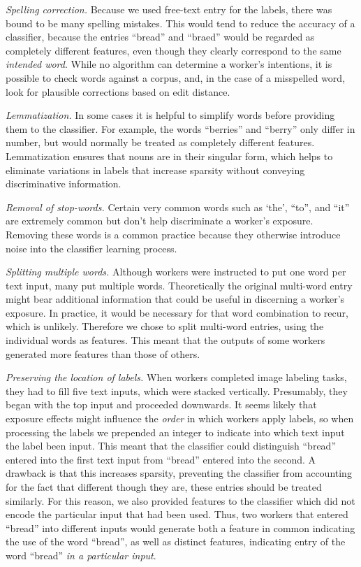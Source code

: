 \documentclass[12pt]{article}
\begin{document}
	\textit{Spelling correction.}  Because we used free-text
	entry for the labels, there was bound to be many spelling mistakes.
	This would tend to reduce the accuracy of a classifier, because the 
	entries ``bread'' and ``braed'' would be regarded as completely different
	features, even though they clearly correspond to the same 
	\textit{intended word}.  While no algorithm can determine a worker's 
	intentions, it is possible to check words against a corpus, and, in the
	case of a misspelled word, look for plausible corrections based on 
	edit distance.

	\textit{Lemmatization.}  In some cases it is helpful to simplify words 
	before providing them to the classifier.  For example, the words 
	``berries'' and ``berry'' only differ in number, but would normally be
	treated as completely different features.  Lemmatization ensures that
	nouns are in their singular form, which helps to eliminate variations in
	labels that increase sparsity without conveying discriminative 
	information.

	\textit{Removal of stop-words.}  Certain very common words such as `the',
	``to'', and ``it'' are extremely common but don't help discriminate a 
	worker's exposure.  Removing these words is a common practice because
	they otherwise introduce noise into the classifier learning process.

	\textit{Splitting multiple words.}  Although workers were 
	instructed to put one word per text input, many put multiple words.
	Theoretically the original multi-word entry might bear additional 
	information that could be useful in discerning a worker's exposure. 
	In practice, it would be necessary for that word combination to recur,
	which is unlikely.  Therefore we chose to split multi-word entries,
	using the individual words as features.  This meant that the outputs of
	some workers generated more features than those of others.

	\textit{Preserving the location of labels.}  When workers completed image
	labeling tasks, they had to fill five text inputs, which were stacked
	vertically.  Presumably, they began with the top input and proceeded 
	downwards.  It seems likely that exposure effects might influence the
	\textit{order} in which workers apply labels, so when processing the 
	labels we prepended an integer to indicate into which text input the 
	label been input.  This meant that the classifier could distinguish
	``bread'' entered into the first text input from ``bread'' entered into
	the second.  A drawback is that this increases sparsity, preventing the
	classifier from accounting for the fact that different though they are,
	these entries should be treated similarly.  For this reason, we also
	provided features to the classifier which did not encode the particular
	input that had been used.  Thus, two workers that entered ``bread''
	into different inputs would generate both a feature in common indicating
	the use of the word ``bread'', as well as distinct features, indicating
	entry of the word ``bread'' \textit{in a particular input}.
\end{document}
